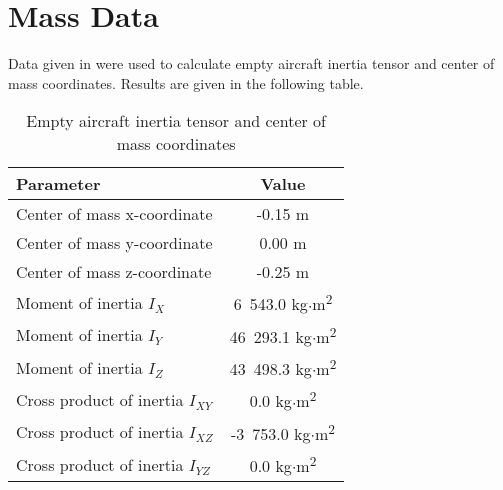 \section{Mass Data}

Data given in \cite{UH60_OperatorsManual,NASA-CR-166309,UH60_MaintenanceManual} were used to calculate empty aircraft inertia tensor and center of mass coordinates. Results are given in the following table.

\begin{table}[h!]
  \begin{center}
    \begin{tabular}{ | l | c | }
      \hline
      \textbf{Parameter} & \textbf{Value} \\ \hline
      Center of mass x-coordinate & -0.15 m \\ \hline
      Center of mass y-coordinate &  0.00 m \\ \hline
      Center of mass z-coordinate & -0.25 m \\ \hline
      Moment of inertia $I_X$ &  6~543.0 kg$\cdot$m\textsuperscript{2} \\ \hline
      Moment of inertia $I_Y$ & 46~293.1 kg$\cdot$m\textsuperscript{2} \\ \hline
      Moment of inertia $I_Z$ & 43~498.3 kg$\cdot$m\textsuperscript{2} \\ \hline
      Cross product of inertia $I_{XY}$ &      0.0 kg$\cdot$m\textsuperscript{2} \\ \hline
      Cross product of inertia $I_{XZ}$ & -3~753.0 kg$\cdot$m\textsuperscript{2} \\ \hline
      Cross product of inertia $I_{YZ}$ &      0.0 kg$\cdot$m\textsuperscript{2} \\ \hline
    \end{tabular}
    \caption{Empty aircraft inertia tensor and center of mass coordinates}
  \end{center}
\end{table}

\clearpage


\thispagestyle{empty}

